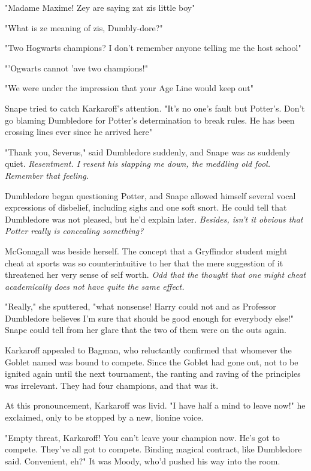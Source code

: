 "Madame Maxime! Zey are saying zat zis little boy{\el}"

"What is ze meaning of zis, Dumbly-dore?"

"Two Hogwarts champions? I don't remember anyone telling me the host school{\el}"

"'Ogwarts cannot 'ave two champions!"

"We were under the impression that your Age Line would keep out{\el}"

Snape tried to catch Karkaroff's attention. "It's no one's fault but Potter's. Don't go blaming Dumbledore for Potter's determination to break rules. He has been crossing lines ever since he arrived here{\el}"

"Thank you, Severus," said Dumbledore suddenly, and Snape was as suddenly quiet. \emph{Resentment. I resent his slapping me down, the meddling old fool. Remember that feeling.}

Dumbledore began questioning Potter, and Snape allowed himself several vocal expressions of disbelief, including sighs and one soft snort. He could tell that Dumbledore was not pleased, but he'd explain later. \emph{Besides, isn't it obvious that Potter really is concealing something?}

McGonagall was beside herself. The concept that a Gryffindor student might cheat at sports was so counterintuitive to her that the mere suggestion of it threatened her very sense of self worth. \emph{Odd that the thought that one might cheat academically does not have quite the same effect.}

"Really," she sputtered, "what nonsense! Harry could not{\el} and as Professor Dumbledore believes{\el} I'm sure that should be good enough for everybody else!" Snape could tell from her glare that the two of them were on the outs again.

Karkaroff appealed to Bagman, who reluctantly confirmed that whomever the Goblet named was bound to compete. Since the Goblet had gone out, not to be ignited again until the next tournament, the ranting and raving of the principles was irrelevant. They had four champions, and that was it.

At this pronouncement, Karkaroff was livid. "I have half a mind to leave now!" he exclaimed, only to be stopped by a new, lionine voice.

"Empty threat, Karkaroff! You can't leave your champion now. He's got to compete. They've all got to compete. Binding magical contract, like Dumbledore said. Convenient, eh?" It was Moody, who'd pushed his way into the room.

